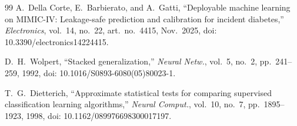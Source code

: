 \documentclass[conference]{IEEEtran}
\begin{document}
\begin{thebibliography}{99}
A.~Della Corte, E.~Barbierato, and A.~Gatti, ``Deployable machine learning on MIMIC-IV: Leakage-safe prediction and calibration for incident diabetes,'' \textit{Electronics}, vol.~14, no.~22, art.~no.~4415, Nov.~2025, doi: 10.3390/electronics14224415.

D.~H.~Wolpert, ``Stacked generalization,'' \textit{Neural Netw.}, vol.~5, no.~2, pp.~241--259, 1992, doi: 10.1016/S0893-6080(05)80023-1.

T.~G.~Dietterich, ``Approximate statistical tests for comparing supervised classification learning algorithms,'' \textit{Neural Comput.}, vol.~10, no.~7, pp.~1895--1923, 1998, doi: 10.1162/089976698300017197.

\end{thebibliography}
\end{document}
